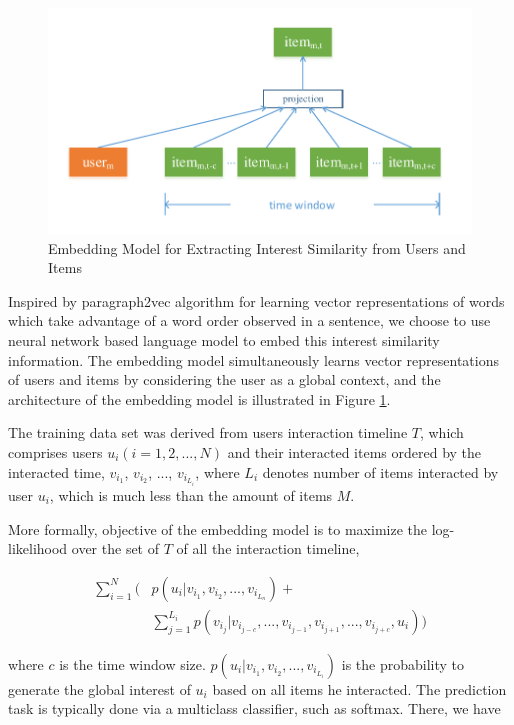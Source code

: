 \documentclass{sig-alternate-05-2015}
\begin{document}
\begin{figure}[htbp]
	\centering
	\includegraphics[scale=0.55]{images/2.pdf}
	\caption{Embedding Model for Extracting Interest Similarity from Users and Items}
	\label{fig:embedding}
\end{figure}

Inspired by paragraph2vec algorithm \cite{le2014distributed} for learning
vector representations of words which take advantage of
a word order observed in a sentence,
we choose to use neural network based language model
to embed this interest similarity information.
The embedding model simultaneously learns vector representations of users and items
by considering the user as a global context,
and the architecture of the embedding model is illustrated in Figure \ref{fig:embedding}.

The training data set was derived from users interaction timeline $T$,
which comprises users $u_i (i=1,2,...,N)$ and their interacted items ordered by the interacted time,
$v_{i_1}$, $v_{i_2}$, ..., $v_{i_{L_i}}$,
where $L_i$ denotes number of items interacted by user $u_i$,
which is much less than the amount of items $M$.

More formally, objective of the embedding model is to
maximize the log-likelihood over the set of $T$ of all the interaction timeline,

\begin{equation}
\begin{aligned}
	\sum_{i=1}^{N} \bigg( &p(u_i | v_{i_1}, v_{i_2}, ..., v_{i_{L_n}}) + \\
	                      &\sum_{j=1}^{L_i} p(v_{i_j} | v_{i_{j-c}}, ..., v_{i_{j-1}}, v_{i_{j+1}},..., v_{i_{j+c}}, u_i) \bigg)
\end{aligned}
\end{equation}

where $c$ is the time window size.
$p(u_i | v_{i_1}, v_{i_2}, ..., v_{i_{L_i}})$ is the probability to generate
the global interest of $u_i$ based on all items he interacted.
The prediction task is typically done via a multiclass classifier,
such as softmax. There, we have
\end{document}
